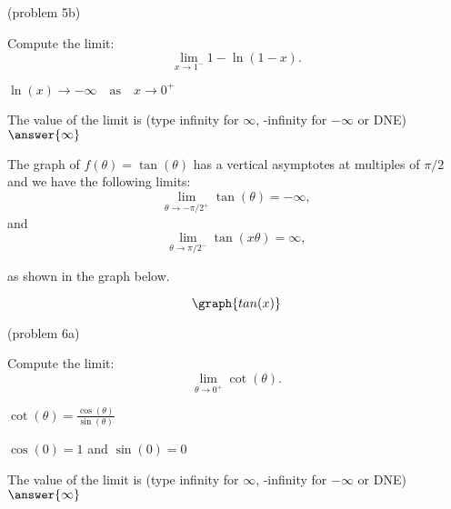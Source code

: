 \documentclass[handout]{ximera}
\begin{document}
\begin{problem}(problem 5b)
  
	Compute the limit:
  \[
  \lim_{x \to {1^-}} 1 - \ln(1-x).
  \]
		\begin{hint}
		  $\ln(x) \to -\infty \quad \text{as} \quad x \to 0^+$
		\end{hint}	
		The value of the limit is
		(type infinity for $\infty$, -infinity for $-\infty$ or DNE)
		 $\answer{\infty}$
		
\end{problem}

\begin{example}[example 6]
The graph of $f(\theta) = \tan(\theta)$ has a vertical asymptotes at multiples of $\pi/2$ and
we have the following limits: 
\[
\lim_{\theta\to -\pi/2^+} \tan(\theta) = -\infty,
\]
and
\[
\lim_{\theta\to \pi/2^-} \tan(x\theta) = \infty,
\]

as shown in the graph below.
		
			
\[
\graph{tan(x)}
\]
\end{example}

\begin{problem}(problem 6a)
  
	Compute the limit:
  \[
  \lim_{\theta \to {0^+}} \cot(\theta).
  \]
		\begin{hint}
		  $\cot(\theta) = \frac{\cos(\theta)}{\sin(\theta)}$
		\end{hint}	
		\begin{hint}
		  $\cos(0) = 1$ and $\sin(0) = 0$
		\end{hint}
		
		The value of the limit is
		(type infinity for $\infty$, -infinity for $-\infty$ or DNE)
		 $\answer{\infty}$
		
\end{problem}
\end{document}
